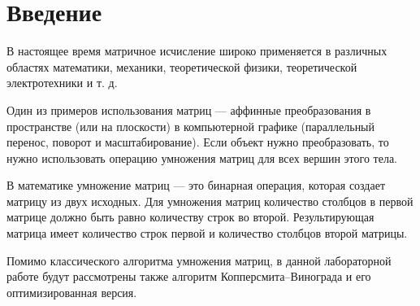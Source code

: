 {\center\chapter*{Введение}}

В настоящее время матричное исчисление широко применяется в различных областях математики, механики, теоретической физики, теоретической электротехники и т. д. \cite{Gantmacher1966}

Один из примеров использования матриц --- аффинные преобразования в пространстве (или на плоскости) в компьютерной графике (параллельный перенос, поворот и масштабирование). Если объект нужно преобразовать, то нужно использовать операцию умножения матриц для всех вершин этого тела.

В математике умножение матриц --- это бинарная операция, которая создает матрицу из двух исходных. Для умножения матриц количество столбцов в первой матрице должно быть равно количеству строк во второй. Результирующая матрица имеет количество строк первой и количество столбцов второй матрицы.

Помимо классического алгоритма умножения матриц, в данной лабораторной работе будут рассмотрены также алгоритм Копперсмита--Винограда и его оптимизированная версия.
